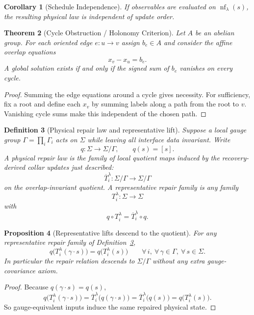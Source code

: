 \documentclass[11pt]{article}
\newtheorem{theorem}{Theorem}[section]
\newtheorem{corollary}[theorem]{Corollary}
\newtheorem{proposition}[theorem]{Proposition}
\newtheorem{definition}[theorem]{Definition}
\newcommand{\nf}{\operatorname{nf}}
\begin{document}
\begin{corollary}[Schedule Independence]
If observables are evaluated on $\nf_\lambda(s)$, the resulting physical law is independent of update order.
\end{corollary}

\begin{theorem}[Cycle Obstruction / Holonomy Criterion]\label{thm:holonomy}
Let $A$ be an abelian group. For each oriented edge $e:u\to v$ assign $b_e\in A$ and consider the affine overlap equations
\[
x_v-x_u=b_e.
\]
A global solution exists if and only if the signed sum of $b_e$ vanishes on every cycle.
\end{theorem}

\begin{proof}
Summing the edge equations around a cycle gives necessity. For sufficiency, fix a root and define each $x_v$ by summing labels along a path from the root to $v$. Vanishing cycle sums make this independent of the chosen path.
\end{proof}

\begin{definition}[Physical repair law and representative lift]\label{def:physicalrepair}
Suppose a local gauge group $\Gamma=\prod_i \Gamma_i$ acts on $\Sigma$ while leaving all interface
data invariant. Write
\[
q:\Sigma\to\Sigma/\Gamma,
\qquad
q(s)=[s].
\]
A physical repair law is the family of local quotient maps induced by the
recovery-derived collar updates just described:
\[
\overline T_i^\lambda:\Sigma/\Gamma\to\Sigma/\Gamma
\]
on the overlap-invariant quotient. A representative repair family is any family
\[
T_i^\lambda:\Sigma\to\Sigma
\]
with
\[
q\circ T_i^\lambda=\overline T_i^\lambda\circ q.
\]
\end{definition}

\begin{proposition}[Representative lifts descend to the quotient]\label{prop:repairquot}
For any representative repair family of Definition~\ref{def:physicalrepair},
\[
q\bigl(T_i^\lambda(\gamma\cdot s)\bigr)=q\bigl(T_i^\lambda(s)\bigr)
\qquad
\forall\, i,\ \forall\, \gamma\in\Gamma,\ \forall\, s\in\Sigma.
\]
In particular the repair relation descends to \(\Sigma/\Gamma\) without any extra
gauge-covariance axiom.
\end{proposition}

\begin{proof}
Because \(q(\gamma\cdot s)=q(s)\),
\[
q\bigl(T_i^\lambda(\gamma\cdot s)\bigr)
=
\overline T_i^\lambda\bigl(q(\gamma\cdot s)\bigr)
=
\overline T_i^\lambda\bigl(q(s)\bigr)
=
q\bigl(T_i^\lambda(s)\bigr).
\]
So gauge-equivalent inputs induce the same repaired physical state.
\end{proof}
\end{document}
